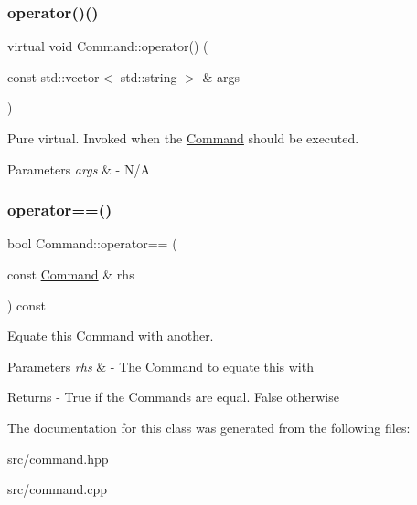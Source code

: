\subsubsection{\texorpdfstring{operator()()}{operator()()}}
{\footnotesize\ttfamily virtual void Command\+::operator() (\begin{DoxyParamCaption}\item[{const std\+::vector$<$ std\+::string $>$ \&}]{args }\end{DoxyParamCaption})\hspace{0.3cm}{\ttfamily [pure virtual]}}

Pure virtual. Invoked when the \mbox{\hyperlink{class_command}{Command}} should be executed. 
\begin{DoxyParams}{Parameters}
{\em args} & -\/ N/A \\
\hline
\end{DoxyParams}
\mbox{\label{class_command_a264fd55e96d28e7687a42108539bd9cf}} 
\subsubsection{\texorpdfstring{operator==()}{operator==()}}
{\footnotesize\ttfamily bool Command\+::operator== (\begin{DoxyParamCaption}\item[{const \mbox{\hyperlink{class_command}{Command}} \&}]{rhs }\end{DoxyParamCaption}) const\hspace{0.3cm}{\ttfamily [virtual]}}

Equate this \mbox{\hyperlink{class_command}{Command}} with another. 
\begin{DoxyParams}{Parameters}
{\em rhs} & -\/ The \mbox{\hyperlink{class_command}{Command}} to equate this with \\
\hline
\end{DoxyParams}
\begin{DoxyReturn}{Returns}
-\/ True if the Commands are equal. False otherwise 
\end{DoxyReturn}


The documentation for this class was generated from the following files\+:\begin{DoxyCompactItemize}
\item 
src/command.\+hpp\item 
src/command.\+cpp\end{DoxyCompactItemize}
